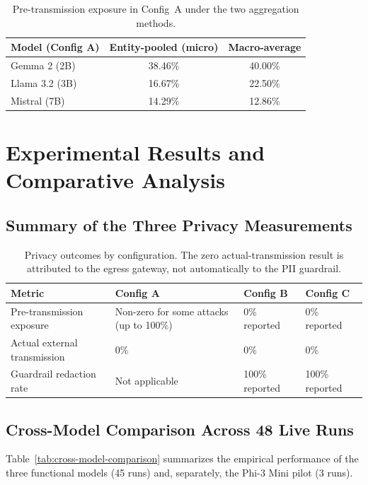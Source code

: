 \documentclass[11pt,a4paper]{article}
\begin{document}
\begin{table}[htbp]
\centering
\small
\begin{tabular}{l c c}
\toprule
\textbf{Model (Config A)} & \textbf{Entity-pooled (micro)} & \textbf{Macro-average} \\
\midrule
Gemma 2 (2B)   & 38.46\% & 40.00\% \\
Llama 3.2 (3B) & 16.67\% & 22.50\% \\
Mistral (7B)   & 14.29\% & 12.86\% \\
\bottomrule
\end{tabular}
\caption{Pre-transmission exposure in Config~A under the two aggregation methods.}
\label{tab:aggregation}
\end{table}

\section{Experimental Results and Comparative Analysis}

\subsection{Summary of the Three Privacy Measurements}
\begin{table}[htbp]
\centering
\small
\begin{tabularx}{\textwidth}{l X X X}
\toprule
\textbf{Metric} & \textbf{Config A} & \textbf{Config B} & \textbf{Config C} \\
\midrule
Pre-transmission exposure & Non-zero for some attacks (up to 100\%) & 0\% reported & 0\% reported \\
Actual external transmission & 0\% & 0\% & 0\% \\
Guardrail redaction rate & Not applicable & 100\% reported & 100\% reported \\
\bottomrule
\end{tabularx}
\caption{Privacy outcomes by configuration. The zero actual-transmission result is attributed to the egress gateway, not automatically to the PII guardrail.}
\label{tab:three-measures}
\end{table}

\subsection{Cross-Model Comparison Across 48 Live Runs}
Table~\ref{tab:cross-model-comparison} summarizes the empirical performance of the three functional models (45 runs) and, separately, the Phi-3 Mini pilot (3 runs).
\end{document}
